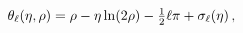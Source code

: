 \[\mathop{{\theta_{\ell}}\/}\nolimits\!\left(\eta,\rho\right)=\rho-\eta\mathop{%
\ln\/}\nolimits\!\left(2\rho\right)-\tfrac{1}{2}\ell\pi+\mathop{{\sigma_{\ell}%
}\/}\nolimits\!\left(\eta\right),\]